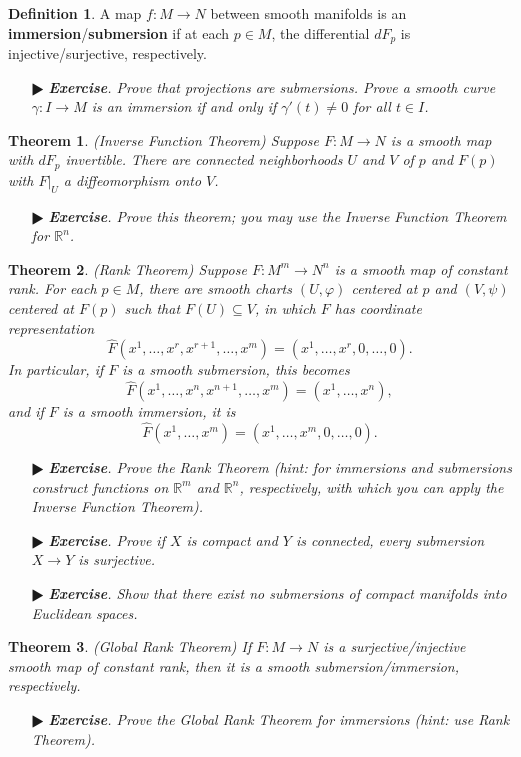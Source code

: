 \documentclass[11pt]{amsart}
\newtheorem*{theorem*}{Theorem}
\theoremstyle{definition}
\newtheorem*{definition*}{Definition}
\renewcommand\hat{\widehat}
\renewcommand\:{\colon}
\newcommand{\R}{\mathds{R}}
\newcommand{\1}{\mathds{1}}
\newcommand{\exc}[1]{\vspace{-2.5pt}\begin{itemize}[leftmargin=15pt]\item[$\RHD$] \textit{\textbf{Exercise}. #1}\end{itemize}}
\begin{document}
\begin{definition*}
	A map $f\: M \to N$ between smooth manifolds is an \textbf{immersion}/\textbf{submersion} if at each $p \in M$, the differential $dF_p$ is injective/surjective, respectively.
\end{definition*}

\exc{Prove that projections are submersions. Prove a smooth curve $\gamma\: I \to M$ is an immersion if and only if $\gamma'(t) \neq 0$ for all $t \in I$.}

\begin{theorem*}
	\textnormal{(Inverse Function Theorem)} Suppose $F\: M \to N$ is a smooth map with $dF_p$ invertible. There are connected neighborhoods $U$ and $V$ of $p$ and $F(p)$ with $F|_U$ a diffeomorphism onto $V$.
\end{theorem*}

\exc{Prove this theorem; you may use the Inverse Function Theorem for $\R^n$.}

\begin{theorem*}
	\textnormal{(Rank Theorem)} Suppose $F\: M^m \to N^n$ is a smooth map of constant rank. For each $p \in M$, there are smooth charts $(U, \varphi)$ centered at $p$ and $(V, \psi)$ centered at $F(p)$ such that $F(U) \subseteq V$, in which $F$ has coordinate representation
		\[ \hat{F}(x^1, \dots, x^r, x^{r+1}, \dots, x^m) = (x^1, \dots, x^r, 0, \dots, 0). \]
	In particular, if $F$ is a smooth submersion, this becomes
		\[ \hat{F}(x^1, \dots, x^n, x^{n+1}, \dots, x^m) = (x^1, \dots, x^n), \]
	and if $F$ is a smooth immersion, it is
		\[ \hat{F}(x^1, \dots, x^m) = (x^1, \dots, x^m, 0, \dots, 0). \]
\end{theorem*}

\exc{Prove the Rank Theorem \textnormal{(}hint: for immersions and submersions construct functions on $\R^m$ and $\R^n$, respectively, with which you can apply the Inverse Function Theorem\textnormal{)}.}
\exc{Prove if $X$ is compact and $Y$ is connected, every submersion $X \to Y$ is surjective.}
\exc{Show that there exist no submersions of compact manifolds into Euclidean spaces.}

\begin{theorem*}
	\textnormal{(Global Rank Theorem)} If $F\: M \to N$ is a surjective/injective smooth map of constant rank, then it is a smooth submersion/immersion, respectively.
\end{theorem*}

\exc{Prove the Global Rank Theorem for immersions \textnormal{(}hint: use Rank Theorem\textnormal{)}.}
\end{document}
